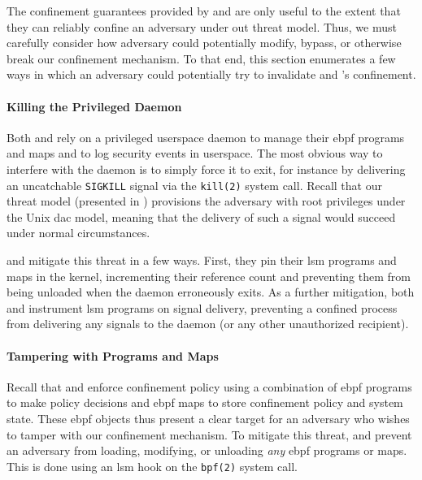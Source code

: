 The confinement guarantees provided by \bpfbox{} and \bpfcontain{} are only useful to the
extent that they can reliably confine an adversary under out threat model. Thus, we must
carefully consider how adversary could potentially modify, bypass, or otherwise break our
confinement mechanism. To that end, this section enumerates a few ways in which an
adversary could potentially try to invalidate \bpfbox{} and \bpfcontain{}'s confinement.

\paragraph*{Killing the Privileged Daemon}
Both \bpfbox{} and \bpfcontain{} rely on a privileged userspace daemon to manage their
\gls{ebpf} programs and maps and to log security events in userspace. The most obvious way
to interfere with the daemon is to simply force it to exit, for instance by delivering an
uncatchable \texttt{SIGKILL} signal via the \texttt{kill(2)} system call. Recall that our
threat model (presented in ) provisions the adversary with root
privileges under the Unix \gls{dac} model, meaning that the delivery of such a signal would
succeed under normal circumstances.

\bpfbox{} and \bpfcontain{} mitigate this threat in a few ways. First, they pin their
\gls{lsm} programs and maps in the kernel, incrementing their reference count and
preventing them from being unloaded when the daemon erroneously exits. As a further
mitigation, both \bpfbox{} and \bpfcontain{} instrument \gls{lsm} programs on signal
delivery, preventing a confined process from delivering any signals to the daemon (or any
other unauthorized recipient).

\paragraph*{Tampering with Programs and Maps}
Recall that \bpfbox{} and \bpfcontain{} enforce confinement policy using a combination of
\gls{ebpf} programs to make policy decisions and \gls{ebpf} maps to store confinement
policy and system state. These \gls{ebpf} objects thus present a clear target for an
adversary who wishes to tamper with our confinement mechanism. To mitigate this threat,
\bpfbox{} and \bpfcontain{} prevent an adversary from loading, modifying, or unloading
\textit{any} \gls{ebpf} programs or maps. This is done using an \gls{lsm} hook on the
\texttt{bpf(2)} system call.

